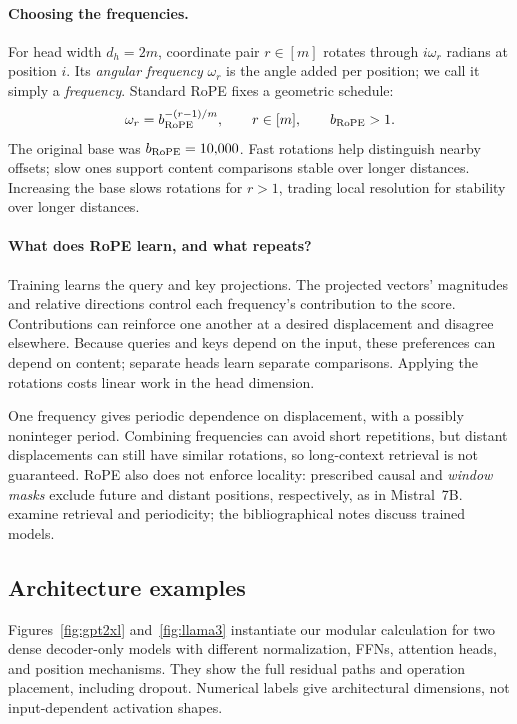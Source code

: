 \documentclass[11pt,twoside]{article}
\theoremstyle{plain}
\theoremstyle{definition}
\theoremstyle{remark}
\begin{document}
\paragraph{Choosing the frequencies.}
For head width $d_h=2m$, coordinate pair $r\in[m]$ rotates through
$i\omega_r$ radians at position $i$. Its \emph{angular frequency} $\omega_r$
is the angle added per position; we call it simply a \emph{frequency}.
Standard RoPE fixes a geometric schedule:
\begin{equation}
\omega_r=b_{\rm RoPE}^{-(r-1)/m},\qquad r\in[m],\qquad b_{\rm RoPE}>1.
\label{eq:rope-frequencies}
\end{equation}
The original base was $b_{\rm RoPE}=10{,}000$. Fast rotations help distinguish
nearby offsets; slow ones support content comparisons stable over longer
distances. Increasing the base slows rotations for $r>1$, trading local
resolution for stability over longer distances.

\paragraph{What does RoPE learn, and what repeats?}
\label{rem:rope-retrieval}
Training learns the query and key projections. The projected vectors'
magnitudes and relative directions control each frequency's contribution to
the score. Contributions can reinforce one another at a desired displacement
and disagree elsewhere. Because queries and keys depend on the input, these
preferences can depend on content; separate heads learn separate comparisons.
Applying the rotations costs linear work in the head dimension.

One frequency gives periodic dependence on displacement, with a possibly
noninteger period. Combining frequencies can avoid short repetitions, but
distant displacements can still have similar rotations, so long-context
retrieval is not guaranteed. RoPE also does not enforce locality: prescribed
causal and \emph{window masks} exclude future and distant positions,
respectively, as in Mistral~7B.
 examine retrieval and periodicity;
the bibliographical notes
discuss trained models.

\subsection{Architecture examples}

Figures~\ref{fig:gpt2xl} and~\ref{fig:llama3} instantiate our modular
calculation for two dense decoder-only models with different normalization,
FFNs, attention heads, and position mechanisms. They show the full residual
paths and operation placement, including dropout. Numerical labels give
architectural dimensions, not input-dependent activation shapes.
\end{document}
